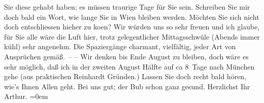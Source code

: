 \begin{ledgroupsized}[t]{13cm}
               Sie diese \label{K_L01862-1v}\label{K_L01862-1h} gehabt haben; es müssen traurige
               Tage für Sie sein. Schreiben Sie mir doch bald ein Wort, {\pb}wie lange Sie in Wien bleiben werden. Möchten Sie sich nicht doch entschliessen hieher zu
                  ko{\geminationm}en? Wir würden uns so sehr freuen und ich glaube,
               für Sie alle wäre die Luft hier, trotz gelegentlicher Mittagsschwüle (Abends immer
               kühl) sehr angenehm. Die Spaziergänge charmant, vielfältig, jeder {\pb}Art von Ansprüchen gemäß. –\pend
           \pstart
           – Wir denken bis Ende August zu bleiben, doch wäre es sehr möglich, daß
               ich in der zweiten August Hälfte auf ca 8 Tage nach München gehe (aus praktischen Reinhardt Gründen.)\pend
           \pstart
           Lassen Sie doch recht bald hören, wie’s Ihnen Allen geht. Bei uns gut; der Bub schon {\pb}ganz gesund.\pend
           \pstart
           Herzlichst Ihr{\\[\baselineskip]}\spacefill\mbox{Arthur.}\pend
           \leftskip=0em{}
         
         \endnumbering{}\end{ledgroupsized}  \newcommand{\dateiname}{L01862}\newcommand{\titel}{Arthur Schnitzler an Richard Beer-Hofmann, 31. 7. 1909}\newcommand{\editorInnen}{Martin Anton Müller und Gerd-Hermann Susen}
      